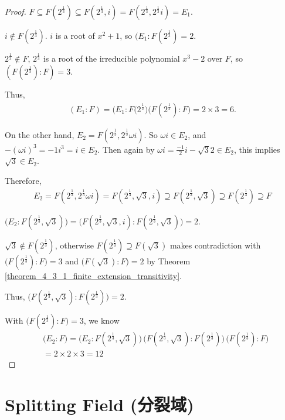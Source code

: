 \documentclass[utf8]{ctexbook}
\theoremstyle{definition}
\begin{document}
\begin{proof}
$F \subseteq F(2^{\frac{1}{3}}) \subseteq F(2^{\frac{1}{3}}, i) = F(2^{\frac{1}{3}}, 2^{\frac{1}{3}} i) = E_1$.

$i \not \in F(2^{\frac{1}{3}})$. $i $ is a root of $x^2 + 1$, so $(E_1: F(2^{\frac{1}{3}}) = 2$.

$2^{\frac{1}{3}} \not \in F$, $2^{\frac{1}{3}}$ is a root of the irreducible polynomial $x^3 -2$ over $F$, so $(F(2^{\frac{1}{3}}): F) = 3$.

Thus,
\begin{align*}
(E_1 :F) = \big( E_1: F(2^{\frac{1}{3}} \big) \big( F(2^{\frac{1}{3}}): F \big) = 2 \times 3 = 6 .
\end{align*}

On the other hand, $E_2 = F(2^{\frac{1}{3}}, 2^{\frac{1}{3}} \omega i)$. So $\omega i \in E_2$, and $- (\omega i )^3 = - 1 i^3 = i \in E_2$. Then again by $\omega i = \frac{-1}{2} i - \sqrt{3}{2} \in E_2$, this implies $\sqrt{3} \in E_2$. 

Therefore,
\begin{align*}
E_2 = F(2^{\frac{1}{3}}, 2^{\frac{1}{3}} \omega i) = F(2^{\frac{1}{3}}, \sqrt{3}, i) \supseteq F(2^{\frac{1}{3}}, \sqrt{3}) \supseteq F(2^{\frac{1}{3}}) \supseteq F
\end{align*}

$\big( E_2 : F(2^{\frac{1}{3}}, \sqrt{3}) \big) = \big( F(2^{\frac{1}{3}}, \sqrt{3}, i) :  F(2^{\frac{1}{3}}, \sqrt{3})  \big)  = 2$.

$\sqrt{3} \not \in F(2^{\frac{1}{3}}) $, otherwise $F(2^{\frac{1}{3}}) \supseteq F(\sqrt{3})  $ makes contradiction with $ \big( F(2^{\frac{1}{3}}) : F \big) = 3$ and $ \big( F(\sqrt{3}) : F \big) = 2$ by Theorem \ref{theorem_4_3_1_finite_extension_transitivity}.

Thus, $\big( F(2^{\frac{1}{3}}, \sqrt{3}) :  F(2^{\frac{1}{3}})  \big) = 2$.

With $\big( F(2^{\frac{1}{3}}) : F \big) = 3$, we know
\begin{align*}
& \big( E_2 : F \big) = \big( E_2 : F(2^{\frac{1}{3}}, \sqrt{3}) \big) \, \big( F(2^{\frac{1}{3}}, \sqrt{3}) :  F(2^{\frac{1}{3}})  \big) \, \big( F(2^{\frac{1}{3}}) : F \big) \\
& = 2 \times 2 \times 3 = 12
\end{align*}

\end{proof}

\section{Splitting Field (分裂域)}
\end{document}
